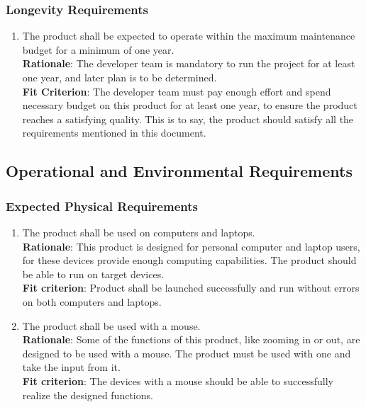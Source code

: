 \documentclass{article}
\begin{document}
\subsubsection{Longevity Requirements}
\begin{enumerate}[PR8.1]
    \item The product shall be expected to operate within the maximum maintenance budget for a minimum of one year.\\
    \textbf{Rationale}: The developer team is mandatory to run the project for at least one year, and later plan is to be determined.\\
    \textbf{Fit Criterion}: The developer team must pay enough effort and spend necessary budget on this product for at least one year, to ensure the product reaches a satisfying quality. This is to say, the product should satisfy all the requirements mentioned in this document.
\end{enumerate}

\subsection{Operational and Environmental Requirements}
\subsubsection{Expected Physical Requirements}
\begin{enumerate}[OE1.1]
    \item The product shall be used on computers and laptops.\\
    \textbf{Rationale}: This product is designed for personal computer and laptop users, for these devices provide enough computing capabilities. The product should be able to run on target devices.\\
    \textbf{Fit criterion}: Product shall be launched successfully and run without errors on both computers and laptops.\\
    \item The product shall be used with a mouse.\\
    \textbf{Rationale}: Some of the functions of this product, like zooming in or out, are designed to be used with a mouse. The product must be used with one and take the input from it.\\
    \textbf{Fit criterion}: The devices with a mouse should be able to successfully realize the designed functions.\\
\end{enumerate}
\end{document}
